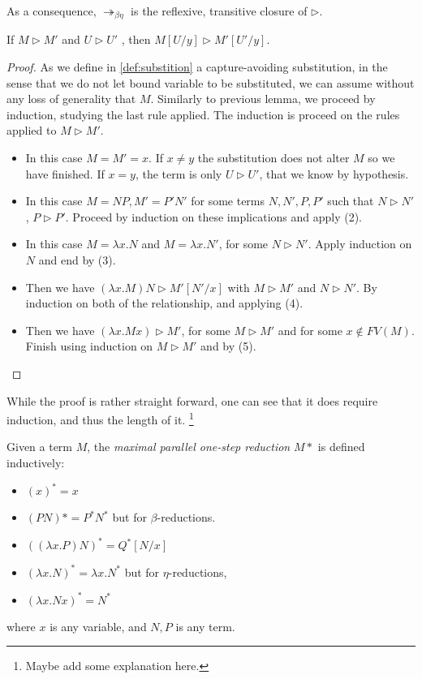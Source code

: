 \begin{remark} As a consequence, $\twoheadrightarrow_{\beta\eta}$ is the reflexive, transitive closure of $\triangleright$.
  \end{remark}
\begin{lemma}If $M \triangleright M'$ and $U \triangleright U'$ , then $M [U/y] \triangleright M' [U' /y]$.
\end{lemma}
\begin{proof}
As we define in \ref{def:substition} a capture-avoiding substitution, in the sense that we do not let bound variable to be substituted, we can assume without any loss of generality that $M$. Similarly to previous lemma, we proceed by induction, studying the last rule applied. The induction is proceed on the rules applied to $M\triangleright M'$.

\begin{itemize}
    \item[(1)] In this case $M=M'=x$. If $x\ne y$ the substitution does not alter $M$ so we have finished. If $x = y$, the term is only $U\triangleright U'$, that we know by hypothesis.
    \item[(2)] In this case $M=NP, M'=P'N'$ for some terms $N,N',P,P'$ such that $N\triangleright N'$, $P\triangleright P'$. Proceed by induction on these implications and apply (2).
    \item[(3)] In this case $M=\lambda x.N$ and $M=\lambda x.N'$, for some $N\triangleright N'$. Apply induction on $N$ and end by (3).
    \item[(4)] Then we have $(\lambda x.M)N \triangleright M'[N'/x]$ with $M \triangleright M'$ and $N \triangleright N'$. By induction on both of the relationship, and applying (4).
    \item[(5)] Then we have $(\lambda x.Mx) \triangleright M'$, for some $M\triangleright M'$ and for some $x \not  \in FV(M)$. Finish using induction on $M\triangleright M'$ and by (5).
    \end{itemize}
\end{proof}

While the proof is rather straight forward, one can see that it does require induction, and thus the length of it. \footnote{Maybe add some explanation here.}

\begin{definition}
  Given a term $M$, the \emph{maximal parallel one-step reduction} $M*$ is defined inductively:
  \begin{itemize}
  \item $(x)^*  =x$ 
  \item $(PN)*=P^*N^*$ but for $\beta$-reductions.
  \item $((\lambda x.P)N)^* = Q^*[N/x] $
  \item $(\lambda x.N)^*=\lambda x.N^*$ but for $\eta$-reductions, 
  \item $(\lambda x.Nx)^*=N^*$ 
  \end{itemize}
  where $x$ is any variable, and $N,P$ is any term.
\end{definition}


